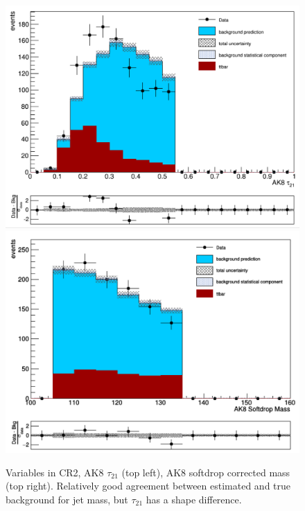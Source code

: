 \begin{figure}[thb!]
\begin{center}
\includegraphics[scale=0.35]{Figures/AK8tau21CR2.pdf}
\includegraphics[scale=0.35]{Figures/AK8jetmassCR2.pdf}\\
\end{center}
\caption{Variables in CR2, AK8 $\tau_{21}$ (top left), AK8 softdrop corrected mass (top right). Relatively good agreement between estimated and true background for jet mass, but $\tau_{21}$ has a shape difference.}
\label{fig:CR2a}
\end{figure}

